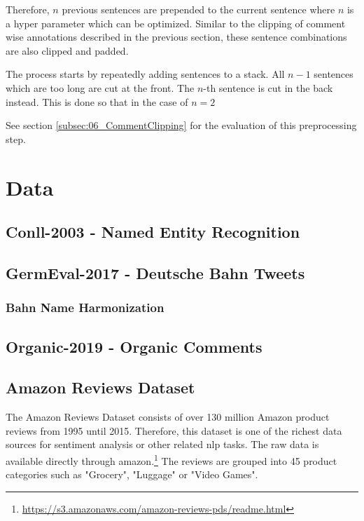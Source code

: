 Therefore, $n$ previous sentences are prepended to the current sentence where $n$ is a hyper parameter which can be optimized. Similar to the clipping of comment wise annotations described in the previous section, these sentence combinations are also clipped and padded. 

The process starts by repeatedly adding sentences to a stack. All $n-1$ sentences which are too long are cut at the front. The $n$-th sentence is cut in the back instead. This is done so that in the case of $n=2$ 


See section \ref{subsec:06_CommentClipping} for the evaluation of this preprocessing step.

\section{Data}
\label{sec:05_Data}


\subsection{Conll-2003 - Named Entity Recognition}
\subsection{GermEval-2017 - Deutsche Bahn Tweets}
\subsubsection*{Bahn Name Harmonization}
\subsection{Organic-2019 - Organic Comments}
\subsection{Amazon Reviews Dataset}

The Amazon Reviews Dataset consists of over 130 million Amazon product reviews from 1995 until 2015. Therefore, this dataset is one of the richest data sources for sentiment analysis or other related \gls{nlp} tasks. The raw data is available directly through amazon.\footnote{\hyperlink{https://s3.amazonaws.com/amazon-reviews-pds/readme.html}{https://s3.amazonaws.com/amazon-reviews-pds/readme.html}} The reviews are grouped into 45 product categories such as "Grocery", "Luggage" or "Video Games". 


